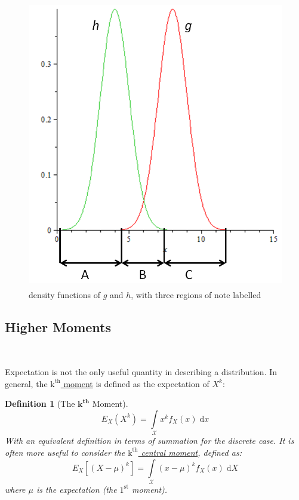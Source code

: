 \documentclass[12pt,a4paper]{article}
\newtheorem{defn}[thm]{Definition}
\begin{document}
\begin{figure}[h]
\begin{center}
\includegraphics[height=12.6cm,width=11.44cm]{M2S1 Importance Sampling.png}
\caption{density functions of $g$ and $h$, with three regions of note labelled}\label{importance sampling}
\end{center}
\end{figure}

\subsection{Higher Moments}$\;$

Expectation is not the only useful quantity in describing a distribution. In general, the \underline{$\mathrm{k^{th}}$ moment} is defined as the expectation of $X^k$:

\begin{defn}[The $\mathbf{k^{th}}$ Moment]
$$E_{X}(X^k) = \int\limits_{\mathcal{X}}\! x^k f_X(x) \;\mathrm{d}x$$
With an equivalent definition in terms of summation for the discrete case.
It is often more useful to consider the \underline{$\mathrm{k^{th}}$ central moment}, defined as:
$$E_{X}[(X - \mu)^k] = \int\limits_{\mathcal{X}}\! (x - \mu)^k f_X(x)\;\mathrm{d}X$$
where $\mu$ is the expectation (the $\mathrm{1^{st}}$ moment).
\end{defn}
\end{document}
